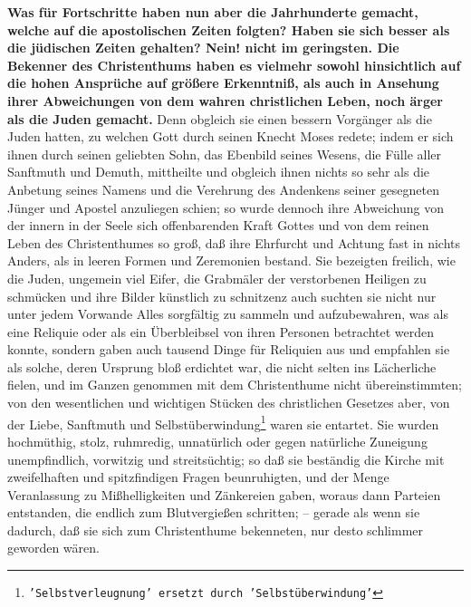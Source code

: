 \textbf{Was für Fortschritte  haben nun aber die Jahrhunderte gemacht, welche auf die
apostolischen Zeiten folgten? Haben sie sich besser als die jüdischen Zeiten
gehalten? Nein! nicht im geringsten. Die Bekenner des Christenthums haben es
vielmehr sowohl hinsichtlich auf die hohen Ansprüche auf größere Erkenntniß, als
auch in Ansehung ihrer Abweichungen von dem wahren christlichen Leben, noch
ärger als die Juden  gemacht.} Denn obgleich sie einen bessern Vorgänger als die
Juden hatten, zu welchen Gott durch seinen Knecht Moses  redete; indem er sich
ihnen durch seinen geliebten Sohn, das Ebenbild seines Wesens, die Fülle aller
Sanftmuth und Demuth, mittheilte und obgleich ihnen nichts so sehr als die
Anbetung seines Namens und die Verehrung des Andenkens seiner gesegneten Jünger
und Apostel anzuliegen schien; so wurde dennoch ihre Abweichung von der innern
in der Seele sich offenbarenden Kraft Gottes und von dem reinen Leben des
Christenthumes so groß, daß ihre Ehrfurcht und Achtung fast in nichts Anders,
als in leeren Formen und Zeremonien bestand. Sie bezeigten freilich, wie die
Juden, ungemein viel Eifer, die Grabmäler der verstorbenen Heiligen  zu schmücken
und ihre Bilder künstlich zu schnitzenz auch suchten sie nicht nur unter jedem
Vorwande Alles sorgfältig zu sammeln und aufzubewahren, was als eine Reliquie 
oder als ein Überbleibsel von ihren Personen betrachtet werden konnte, sondern
gaben auch tausend Dinge für Reliquien aus und empfahlen sie als solche, deren
Ursprung bloß erdichtet war, die nicht selten ins Lächerliche fielen, und im
Ganzen genommen mit dem Christenthume nicht übereinstimmten; von den
wesentlichen und wichtigen Stücken des christlichen Gesetzes aber, von der
Liebe, Sanftmuth und Selbstüberwindung\footnote{\texttt{'Selbstverleugnung' ersetzt durch 'Selbstüberwindung'}} waren sie entartet. Sie wurden
hochmüthig, stolz, ruhmredig, unnatürlich oder gegen natürliche Zuneigung
unempfindlich, vorwitzig und streitsüchtig; so daß sie beständig die Kirche mit
zweifelhaften und spitzfindigen Fragen  beunruhigten, und der Menge Veranlassung
zu Mißhelligkeiten und Zänkereien gaben, woraus dann Parteien entstanden, die
endlich zum Blutvergießen schritten; -- gerade als wenn sie dadurch, daß sie
sich zum Christenthume bekenneten, nur desto schlimmer geworden wären.

\medskip

